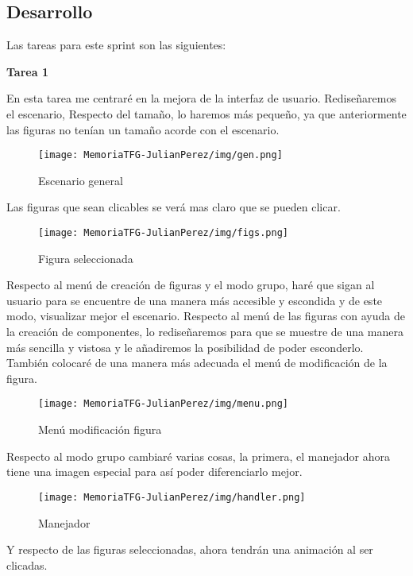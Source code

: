 \documentclass[a4paper, 12pt]{book}
\begin{document}
\subsection{Desarrollo}
Las tareas para este sprint son las siguientes:

\textbf{Tarea 1}

En esta tarea me centraré en la mejora de la interfaz de usuario. Rediseñaremos el escenario, Respecto del tamaño, lo haremos más pequeño, ya que anteriormente las figuras no tenían un tamaño acorde con el escenario.

\begin{figure}[H]
  \centering
  \texttt{[image: MemoriaTFG-JulianPerez/img/gen.png]}
  \caption{Escenario general}\label{gen}
\end{figure}

Las figuras que sean clicables se verá mas claro que se pueden clicar.
\begin{figure}[H]
  \centering
  \texttt{[image: MemoriaTFG-JulianPerez/img/figs.png]}
  \caption{Figura seleccionada}\label{scrum}
\end{figure}

Respecto al menú de creación de figuras y el modo grupo, haré que sigan al usuario para se encuentre de una manera más accesible y escondida y de este modo, visualizar mejor el escenario. Respecto al menú de las figuras con ayuda de la creación de componentes, lo rediseñaremos para que se muestre de una manera más sencilla y vistosa y le añadiremos la posibilidad de poder esconderlo. También colocaré de una manera más adecuada el menú de modificación de la figura. 

\begin{figure}[H]
  \centering
  \texttt{[image: MemoriaTFG-JulianPerez/img/menu.png]}
  \caption{Menú modificación figura}\label{scrum}
\end{figure}

Respecto al modo grupo cambiaré varias cosas, la primera, el manejador ahora tiene una imagen especial para así poder diferenciarlo mejor.

\begin{figure}[H]
  \centering
  \texttt{[image: MemoriaTFG-JulianPerez/img/handler.png]}
  \caption{Manejador}\label{scrum}
\end{figure}

Y respecto de las figuras seleccionadas, ahora tendrán una animación al ser clicadas.
\end{document}
